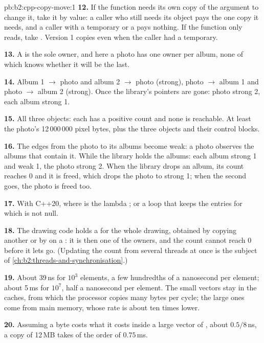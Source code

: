 \begin{solution}{pb:b2:cpp-copy-move:1}
\textbf{12.} If the function needs its own copy of the argument to change it, take it by value: a caller who still
needs its object pays the one copy it needs, and a caller with a temporary or a  pays nothing. If the
function only reads, take . Version 1 copies even when the caller had a temporary.

\textbf{13.} A  is the sole owner, and here a photo has one owner per album, none of which knows
whether it will be the last.

\textbf{14.} Album 1 $\to$ photo and album 2 $\to$ photo (strong), photo $\to$ album 1 and photo $\to$ album 2
(strong). Once the library's pointers are gone: photo strong 2, each album strong 1.

\textbf{15.} All three objects: each has a positive count and none is reachable. At least the photo's 12\,000\,000
pixel bytes, plus the three objects and their control blocks.

\textbf{16.} The edges from the photo to its albums become weak: a photo observes the albums that contain it. While
the library holds the albums: each album strong 1 and weak 1, the photo strong 2. When the library drops an album,
its count reaches 0 and it is freed, which drops the photo to strong 1; when the second goes, the photo is freed too.

\textbf{17.} With C++20,  where  is the lambda
; or a loop that keeps the entries for which
 is not null.

\textbf{18.} The drawing code holds a  for the whole drawing, obtained by copying
another or by  on a : it is then one of the owners, and the count cannot reach 0 before it
lets go. (Updating the count from several threads at once is the subject of \cref{ch:b2:threads-and-synchronisation}.)

\textbf{19.} About 39\,ns for $10^3$ elements, a few hundredths of a nanosecond per element; about 5\,ms for $10^7$,
half a nanosecond per element. The small vectors stay in the caches, from which the processor copies many bytes per
cycle; the large ones come from main memory, whose rate is about ten times lower.

\textbf{20.} Assuming a byte costs what it costs inside a large vector of , about $0.5/8$\,ns, a copy of
12\,MB takes of the order of $0.75$\,ms.


\end{solution}
